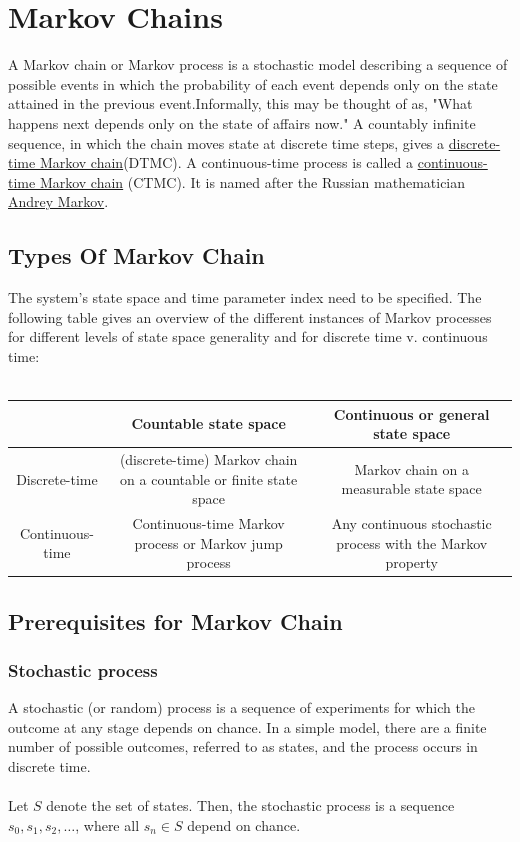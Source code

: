 \documentclass[12pt]{article}
\begin{document}
\section{Markov Chains} 
A Markov chain or Markov process is a stochastic model describing a sequence of possible events in which the probability of each event depends only on the state attained in the previous event.Informally, this may be thought of as, "What happens next depends only on the state of affairs now." A countably infinite sequence, in which the chain moves state at discrete time steps, gives a \href{https://en.wikipedia.org/wiki/Discrete-time_Markov_chain}{discrete-time Markov chain}(DTMC). A continuous-time process is called a \href{https://en.wikipedia.org/wiki/Continuous-time_Markov_chain}{continuous-time Markov chain} (CTMC). It is named after the Russian mathematician \href{https://en.wikipedia.org/wiki/Andrey_Markov}{Andrey Markov}.

\subsection{Types Of Markov Chain}
The system's state space and time parameter index need to be specified. The following table gives an overview of the different instances of Markov processes for different levels of state space generality and for discrete time v. continuous time:\\\\
\begin{tabularx}{0.8\textwidth}{| c | c | c |}
    \hline
    \textbf{} & \textbf{Countable state space} & \textbf{Continuous or general state space} \\
    \hline
    Discrete-time & (discrete-time) Markov chain on a countable or finite state space & Markov chain on a measurable state space \\
    \hline
    Continuous-time & Continuous-time Markov process or Markov jump process & Any continuous stochastic process with the Markov property \\
    \hline
\end{tabularx}

\subsection{Prerequisites for Markov Chain}

\subsubsection{Stochastic process}
A stochastic (or random) process is a sequence of experiments for which the outcome at any stage depends on chance. In a simple model, there are a finite number of possible outcomes, referred to as states, and the process occurs in discrete time.\\\\
Let $S$ denote the set of states. Then, the stochastic process is a sequence $s_0, s_1, s_2, \ldots$, where all $s_n \in S$ depend on chance.
\end{document}
